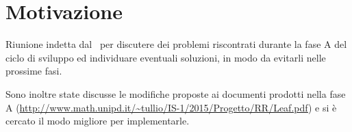 \documentclass[../RiunioneInterna16-02-19.tex]{subfiles}
\begin{document}
\section{Motivazione}
Riunione indetta dal \responsabilediprogetto\ per discutere dei problemi riscontrati durante la fase A del ciclo di sviluppo ed individuare eventuali soluzioni, in modo da evitarli nelle prossime fasi.

Sono inoltre state discusse le modifiche proposte ai documenti prodotti nella fase A (\url{http://www.math.unipd.it/~tullio/IS-1/2015/Progetto/RR/Leaf.pdf}) e si è cercato il modo migliore per implementarle.
\end{document}
